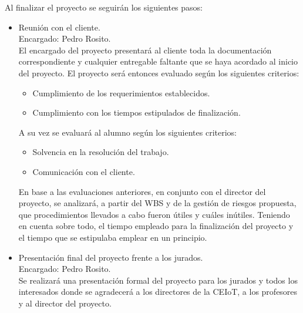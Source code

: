 \documentclass[11pt]{charter}
\begin{document}
Al finalizar el proyecto se seguirán los siguientes pasos:
\begin{itemize}
\item Reunión con el cliente. \\
Encargado: Pedro Rosito. \\
El encargado del proyecto presentará al cliente toda la documentación correspondiente y cualquier entregable faltante que se haya acordado al inicio del proyecto.
El proyecto será entonces evaluado según los siguientes criterios:
\begin{itemize}
\item Cumplimiento de los requerimientos establecidos.
\item Cumplimiento con los tiempos estipulados de finalización.
\end{itemize}
A su vez se evaluará al alumno según los siguientes criterios:
\begin{itemize}
\item Solvencia en la resolución del trabajo.
\item Comunicación con el cliente.
\end{itemize}
En base a las evaluaciones anteriores, en conjunto con el director del proyecto, se analizará, a partir del WBS y de la gestión de riesgos propuesta, que procedimientos llevados a cabo fueron útiles y cuáles inútiles. Teniendo en cuenta sobre todo, el tiempo empleado para la finalización del proyecto y el tiempo que se estipulaba emplear en un principio.
\item Presentación final del proyecto frente a los jurados. \\
Encargado: Pedro Rosito. \\
Se realizará una presentación formal del proyecto para los jurados y todos los interesados donde se agradecerá a los directores de la CEIoT, a los profesores y al director del proyecto.
\end{itemize}
\end{document}
